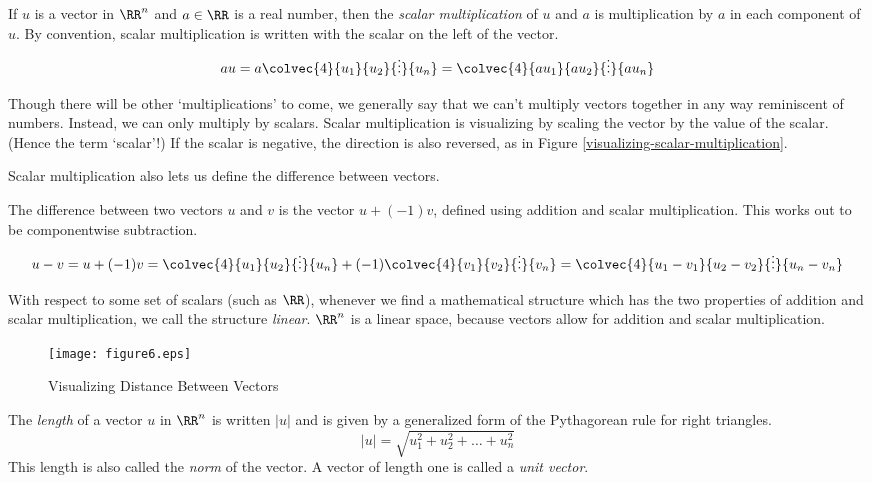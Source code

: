 \documentclass[fleqn]{report}
\begin{document}
\begin{defn}
If $u$ is a vector in $\RR^n$ and $a \in
\RR$ is a real number, then the \emph{scalar multiplication} of
$u$ and $a$ is multiplication by $a$ in each component of $u$.
By convention, scalar multiplication is written with the
scalar on the left of the vector.
\begin{equation*}
au = a \colvec{4}{u_1}{u_2}{\vdots}{u_n} =
\colvec{4}{au_1}{au_2}{\vdots}{au_n}
\end{equation*}
\end{defn}

Though there will be other `multiplications' to come, we
generally say that we can't multiply vectors together in any
way reminiscent of numbers. Instead, we can only multiply by
scalars. Scalar multiplication is visualizing by scaling the
vector by the value of the scalar. (Hence the term `scalar'!)
If the scalar is negative, the direction is also reversed, as
in Figure \ref{visualizing-scalar-multiplication}.
 
Scalar multiplication also lets us define the difference
between vectors. 
\newpage

\begin{defn}
The difference between two vectors $u$ and $v$ is the vector $u +
(-1)v$, defined using addition and scalar multiplication. This
works out to be componentwise subtraction.
\begin{equation*}
u - v = u + (-1) v= \colvec{4}{u_1}{u_2}{\vdots}{u_n} + (-1)
\colvec{4}{v_1}{v_2}{\vdots}{v_n} = \colvec{4}{u_1 - v_1}{u_2
- v_2}{\vdots}{u_n - v_n}
\end{equation*}
\end{defn}

\begin{defn}
With respect to some set of scalars (such as $\RR$), whenever
we find a mathematical structure which has the two properties
of addition and scalar multiplication, we call the structure
\emph{linear}. $\RR^n$ is a linear space, because vectors
allow for addition and scalar multiplication.
\end{defn}

\begin{figure}[t]
\centering
\texttt{[image: figure6.eps]}
\caption{Visualizing Distance Between Vectors}
\label{difference-and-length}
\end{figure}

\begin{defn}
The \emph{length} of a vector $u$ in
$\RR^n$ is written $|u|$ and is given by a generalized form of
the Pythagorean rule for right triangles.
\begin{equation*}
|u| = \sqrt{u_1^2 + u_2^2 + \ldots + u_n^2}
\end{equation*}
This length is also called the \emph{norm} of the vector.
A vector of length one is called a \emph{unit vector}.
\end{defn}
\end{document}
